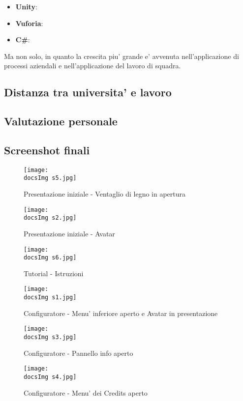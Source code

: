 \begin{itemize}
	\item \textbf{Unity}:
	\item \textbf{Vuforia}:
	\item \textbf{C\#}:
\end{itemize}

Ma non solo, in quanto la crescita piu' grande e' avvenuta nell'applicazione di processi aziendali e nell'applicazione del lavoro di squadra.
\subsection{Distanza tra universita' e lavoro}
\subsection{Valutazione personale}
\newpage
\subsection{Screenshot finali}

	\begin{figure}[H]
		\centering
		\texttt{[image: \\docsImg s5.jpg]}
		\caption{Presentazione iniziale - Ventaglio di legno in apertura}
		\label{fig:Presentazione iniziale - Ventaglio di legno in apertura}
	\end{figure}
	
	\begin{figure}[H]
		\centering
		\texttt{[image: \\docsImg s2.jpg]}
		\caption{Presentazione iniziale - Avatar}
		\label{fig:Presentazione iniziale - Avatar}
	\end{figure}
		
	\begin{figure}[H]
		\centering
		\texttt{[image: \\docsImg s6.jpg]}
		\caption{Tutorial - Istruzioni}
		\label{fig:Tutorial - Istruzioni}
	\end{figure}	
	
	\begin{figure}[H]
		\centering
		\texttt{[image: \\docsImg s1.jpg]}
		\caption{Configuratore - Menu' inferiore aperto e Avatar in presentazione}
		\label{fig:Configuratore - Menu' inferiore aperto e Avatar in presentazione}
	\end{figure}
	
	\begin{figure}[H]
		\centering
		\texttt{[image: \\docsImg s3.jpg]}
		\caption{Configuratore - Pannello info aperto}
		\label{fig:Configuratore - Pannello info aperto}
	\end{figure}
		
	\begin{figure}[H]
		\centering
		\texttt{[image: \\docsImg s4.jpg]}
		\caption{Configuratore - Menu' dei Credits aperto}
		\label{fig:Configuratore - Menu' dei Credits aperto}
	\end{figure}